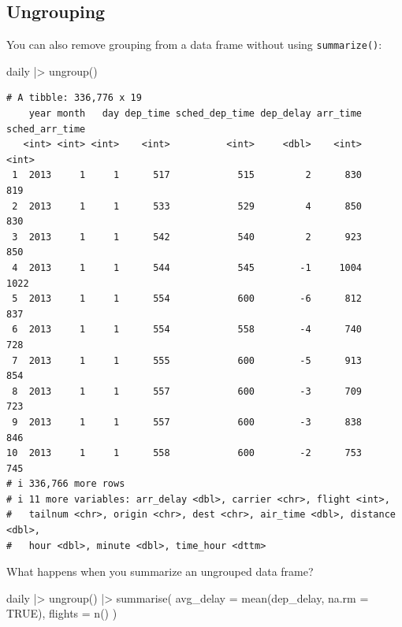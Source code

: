 \documentclass[
  letterpaper,
  DIV=11,
  numbers=noendperiod]{scrreprt}
\newenvironment{Shaded}{\begin{snugshade}}{\end{snugshade}}
\newcommand{\AttributeTok}[1]{\textcolor[rgb]{0.40,0.45,0.13}{#1}}
\newcommand{\ConstantTok}[1]{\textcolor[rgb]{0.56,0.35,0.01}{#1}}
\newcommand{\FunctionTok}[1]{\textcolor[rgb]{0.28,0.35,0.67}{#1}}
\newcommand{\NormalTok}[1]{\textcolor[rgb]{0.00,0.23,0.31}{#1}}
\newcommand{\SpecialCharTok}[1]{\textcolor[rgb]{0.37,0.37,0.37}{#1}}
\begin{document}
\subsection{Ungrouping}\label{ungrouping}

You can also remove grouping from a data frame without using
\texttt{summarize()}:

\begin{Shaded}
\begin{Highlighting}[]
\NormalTok{daily }\SpecialCharTok{|\textgreater{}}
  \FunctionTok{ungroup}\NormalTok{()}
\end{Highlighting}
\end{Shaded}

\begin{verbatim}
# A tibble: 336,776 x 19
    year month   day dep_time sched_dep_time dep_delay arr_time sched_arr_time
   <int> <int> <int>    <int>          <int>     <dbl>    <int>          <int>
 1  2013     1     1      517            515         2      830            819
 2  2013     1     1      533            529         4      850            830
 3  2013     1     1      542            540         2      923            850
 4  2013     1     1      544            545        -1     1004           1022
 5  2013     1     1      554            600        -6      812            837
 6  2013     1     1      554            558        -4      740            728
 7  2013     1     1      555            600        -5      913            854
 8  2013     1     1      557            600        -3      709            723
 9  2013     1     1      557            600        -3      838            846
10  2013     1     1      558            600        -2      753            745
# i 336,766 more rows
# i 11 more variables: arr_delay <dbl>, carrier <chr>, flight <int>,
#   tailnum <chr>, origin <chr>, dest <chr>, air_time <dbl>, distance <dbl>,
#   hour <dbl>, minute <dbl>, time_hour <dttm>
\end{verbatim}

What happens when you summarize an ungrouped data frame?

\begin{Shaded}
\begin{Highlighting}[]
\NormalTok{daily }\SpecialCharTok{|\textgreater{}}
  \FunctionTok{ungroup}\NormalTok{() }\SpecialCharTok{|\textgreater{}}
  \FunctionTok{summarise}\NormalTok{(}
    \AttributeTok{avg\_delay =} \FunctionTok{mean}\NormalTok{(dep\_delay, }\AttributeTok{na.rm =} \ConstantTok{TRUE}\NormalTok{),}
    \AttributeTok{flights =} \FunctionTok{n}\NormalTok{()}
\NormalTok{  )}
\end{Highlighting}
\end{Shaded}
\end{document}
